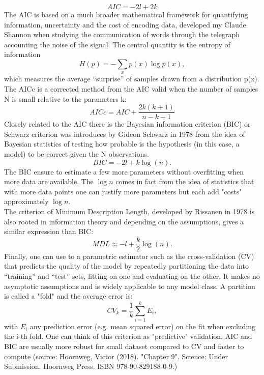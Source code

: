 $$
AIC = -2l +2k
$$
The AIC is based on a much broader mathematical framework for quantifying information, uncertainty and the cost of encoding data, developed my Claude Shannon when studying the communication of words through the telegraph accounting the noise of the signal. The central quantity is the entropy of information
$$
H(p) = -\sum _x p(x) \log p(x),
$$
which measures the average “surprise” of samples drawn from a distribution p(x).\\
The AICc is a corrected method from the AIC valid when the number of samples N is small relative to the parameters k:
$$
AICc = AIC + \frac{2k(k+1)}{n-k-1}
$$
Closely related to the AIC there is the Bayesian information criterion (BIC) or  Schwarz criterion was introduces by Gideon Schwarz in 1978 from the idea of Bayesian statistics of testing how probable is the hypothesis (in this case, a model) to be correct given the N observations. 
$$
BIC = -2l + k \log(n).
$$
The BIC ensure to estimate a few more parameters without overfitting when more data are available. The $\log n$ comes in fact from the idea of statistics that with more data points one can justify more parameters but each add "costs" approximately $\log n$.\\
The criterion of Minimum Description Length, developed by Rissanen in 1978 is also rooted in information theory and depending on the assumptions, gives a similar expression than BIC:
$$
MDL \approx -l + \frac{k}{2} \log(n).
$$
Finally, one can use to a parametric estimator such as the cross-validation (CV) that predicts the quality of the model by repeatedly partitioning the data into “training” and “test” sets, fitting on one and evaluating on the other. It makes no asymptotic assumptions and is widely applicable to any model class. A partition is called a "fold" and the average error is:
$$
CV_k = \frac{1}{k}\sum_{i=1} ^k E _i,
$$
with $E_i$ any prediction error (e.g. mean squared error) on the fit when excluding the i-th fold. One can think of this criterion as "predictive" validation.
AIC and BIC are usually more robust for small dataset compared to CV and faster to compute (source: Hoornweg, Victor (2018). "Chapter 9". Science: Under Submission. Hoornweg Press. ISBN 978-90-829188-0-9.)
